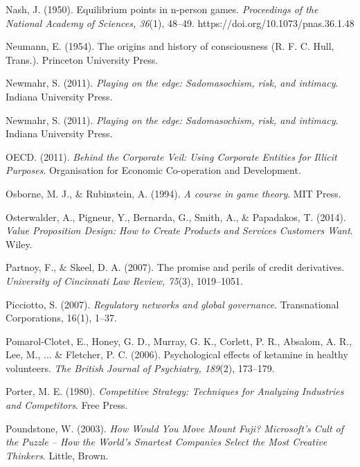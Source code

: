 \begin{thebibliography}{}
    Nash, J. (1950). Equilibrium points in n-person games. \textit{Proceedings of the National Academy of Sciences, 36}(1), 48–49. https://doi.org/10.1073/pnas.36.1.48

    Neumann, E. (1954). The origins and history of consciousness (R. F. C. Hull, Trans.). Princeton University Press.

    Newmahr, S. (2011). \textit{Playing on the edge: Sadomasochism, risk, and intimacy}. Indiana University Press.

    Newmahr, S. (2011). \textit{Playing on the edge: Sadomasochism, risk, and intimacy}. Indiana University Press.


    OECD. (2011). \textit{Behind the Corporate Veil: Using Corporate Entities for Illicit Purposes}. Organisation for Economic Co-operation and Development.

    Osborne, M. J., \& Rubinstein, A. (1994). \textit{A course in game theory}. MIT Press.

    Osterwalder, A., Pigneur, Y., Bernarda, G., Smith, A., \& Papadakos, T. (2014). \textit{Value Proposition Design: How to Create Products and Services Customers Want}. Wiley.


    Partnoy, F., \& Skeel, D. A. (2007). The promise and perils of credit derivatives. \textit{University of Cincinnati Law Review, 75}(3), 1019–1051.

    Picciotto, S. (2007). \textit{Regulatory networks and global governance}. Transnational Corporations, 16(1), 1–37.

    Pomarol-Clotet, E., Honey, G. D., Murray, G. K., Corlett, P. R., Absalom, A. R., Lee, M., ... \& Fletcher, P. C. (2006). Psychological effects of ketamine in healthy volunteers. \textit{The British Journal of Psychiatry, 189}(2), 173–179.

    Porter, M. E. (1980). \textit{Competitive Strategy: Techniques for Analyzing Industries and Competitors}. Free Press.

    Poundstone, W. (2003). \textit{How Would You Move Mount Fuji? Microsoft's Cult of the Puzzle -- How the World's Smartest Companies Select the Most Creative Thinkers}. Little, Brown.


\end{thebibliography}
